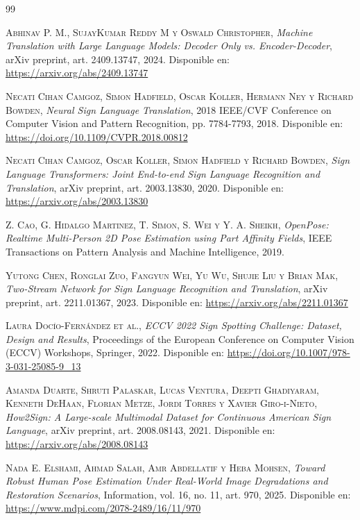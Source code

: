\begin{thebibliography}{99}

 \textsc{Abhinav P. M., SujayKumar Reddy M y Oswald Christopher}, \textit{Machine Translation with Large Language Models: Decoder Only vs. Encoder-Decoder}, arXiv preprint, art. 2409.13747, 2024. Disponible en: \url{https://arxiv.org/abs/2409.13747}

 \textsc{Necati Cihan Camgoz, Simon Hadfield, Oscar Koller, Hermann Ney y Richard Bowden}, \textit{Neural Sign Language Translation}, 2018 IEEE/CVF Conference on Computer Vision and Pattern Recognition, pp. 7784-7793, 2018. Disponible en: \url{https://doi.org/10.1109/CVPR.2018.00812}

 \textsc{Necati Cihan Camgoz, Oscar Koller, Simon Hadfield y Richard Bowden}, \textit{Sign Language Transformers: Joint End-to-end Sign Language Recognition and Translation}, arXiv preprint, art. 2003.13830, 2020. Disponible en: \url{https://arxiv.org/abs/2003.13830}

 \textsc{Z. Cao, G. Hidalgo Martinez, T. Simon, S. Wei y Y. A. Sheikh}, \textit{OpenPose: Realtime Multi-Person 2D Pose Estimation using Part Affinity Fields}, IEEE Transactions on Pattern Analysis and Machine Intelligence, 2019.

 \textsc{Yutong Chen, Ronglai Zuo, Fangyun Wei, Yu Wu, Shujie Liu y Brian Mak}, \textit{Two-Stream Network for Sign Language Recognition and Translation}, arXiv preprint, art. 2211.01367, 2023. Disponible en: \url{https://arxiv.org/abs/2211.01367}

 \textsc{Laura Docío-Fernández et al.}, \textit{ECCV 2022 Sign Spotting Challenge: Dataset, Design and Results}, Proceedings of the European Conference on Computer Vision (ECCV) Workshops, Springer, 2022. Disponible en: \url{https://doi.org/10.1007/978-3-031-25085-9_13}

 \textsc{Amanda Duarte, Shruti Palaskar, Lucas Ventura, Deepti Ghadiyaram, Kenneth DeHaan, Florian Metze, Jordi Torres y Xavier Giro-i-Nieto}, \textit{How2Sign: A Large-scale Multimodal Dataset for Continuous American Sign Language}, arXiv preprint, art. 2008.08143, 2021. Disponible en: \url{https://arxiv.org/abs/2008.08143}

 \textsc{Nada E. Elshami, Ahmad Salah, Amr Abdellatif y Heba Mohsen}, \textit{Toward Robust Human Pose Estimation Under Real-World Image Degradations and Restoration Scenarios}, Information, vol. 16, no. 11, art. 970, 2025. Disponible en: \url{https://www.mdpi.com/2078-2489/16/11/970}


\end{thebibliography}
